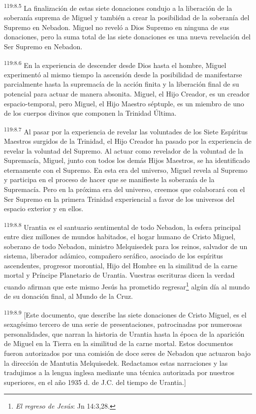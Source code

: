 \par
\textsuperscript{119:8.5} La finalización de estas siete donaciones condujo a la liberación de la soberanía suprema de Miguel y también a crear la posibilidad de la soberanía del Supremo en Nebadon. Miguel no reveló a Dios Supremo en ninguna de sus donaciones, pero la suma total de las siete donaciones es una nueva revelación del Ser Supremo en Nebadon.

\par
\textsuperscript{119:8.6} En la experiencia de descender desde Dios hasta el hombre, Miguel experimentó al mismo tiempo la ascensión desde la posibilidad de manifestarse parcialmente hasta la supremacía de la acción finita y la liberación final de su potencial para actuar de manera absonita. Miguel, el Hijo Creador, es un creador espacio-temporal, pero Miguel, el Hijo Maestro séptuple, es un miembro de uno de los cuerpos divinos que componen la Trinidad Última.

\par
\textsuperscript{119:8.7} Al pasar por la experiencia de revelar las voluntades de los Siete Espíritus Maestros surgidos de la Trinidad, el Hijo Creador ha pasado por la experiencia de revelar la voluntad del Supremo. Al actuar como revelador de la voluntad de la Supremacía, Miguel, junto con todos los demás Hijos Maestros, se ha identificado eternamente con el Supremo. En esta era del universo, Miguel revela al Supremo y participa en el proceso de hacer que se manifieste la soberanía de la Supremacía. Pero en la próxima era del universo, creemos que colaborará con el Ser Supremo en la primera Trinidad experiencial a favor de los universos del espacio exterior y en ellos.

\par
\textsuperscript{119:8.8} Urantia es el santuario sentimental de todo Nebadon, la esfera principal entre diez millones de mundos habitados, el hogar humano de Cristo Miguel, soberano de todo Nebadon, ministro Melquisedek para los reinos, salvador de un sistema, liberador adámico, compañero seráfico, asociado de los espíritus ascendentes, progresor morontial, Hijo del Hombre en la similitud de la carne mortal y Príncipe Planetario de Urantia. Vuestras escrituras dicen la verdad cuando afirman que este mismo Jesús ha prometido regresar\footnote{\textit{El regreso de Jesús}: Jn 14:3,28.} algún día al mundo de su donación final, al Mundo de la Cruz.

\par
\textsuperscript{119:8.9} [Este documento, que describe las siete donaciones de Cristo Miguel, es el sexagésimo tercero de una serie de presentaciones, patrocinadas por numerosas personalidades, que narran la historia de Urantia hasta la época de la aparición de Miguel en la Tierra en la similitud de la carne mortal. Estos documentos fueron autorizados por una comisión de doce seres de Nebadon que actuaron bajo la dirección de Mantutia Melquisedek. Redactamos estas narraciones y las tradujimos a la lengua inglesa mediante una técnica autorizada por nuestros superiores, en el año 1935 d. de J.C. del tiempo de Urantia.]